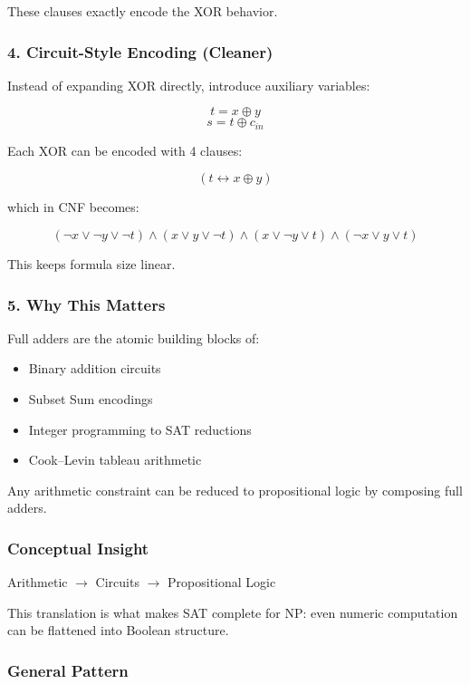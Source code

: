 \documentclass{article}
\begin{document}
These clauses exactly encode the XOR behavior.

\bigskip
\subsubsection*{4. Circuit-Style Encoding (Cleaner)}

Instead of expanding XOR directly, introduce auxiliary variables:

\[
t = x \oplus y
\]
\[
s = t \oplus c_{in}
\]

Each XOR can be encoded with 4 clauses:

\[
(t \leftrightarrow x \oplus y)
\]

which in CNF becomes:

\[
(\neg x \lor \neg y \lor \neg t)
\land
(x \lor y \lor \neg t)
\land
(x \lor \neg y \lor t)
\land
(\neg x \lor y \lor t)
\]

This keeps formula size linear.

\bigskip
\subsubsection*{5. Why This Matters}

Full adders are the atomic building blocks of:

\begin{itemize}
    \item Binary addition circuits
    \item Subset Sum encodings
    \item Integer programming to SAT reductions
    \item Cook--Levin tableau arithmetic
\end{itemize}

Any arithmetic constraint can be reduced to propositional logic
by composing full adders.

\bigskip
\subsubsection*{Conceptual Insight}

Arithmetic $\longrightarrow$ Circuits $\longrightarrow$ Propositional Logic

This translation is what makes SAT complete for NP:
even numeric computation can be flattened into Boolean structure.
\subsubsection*{General Pattern}
\end{document}
